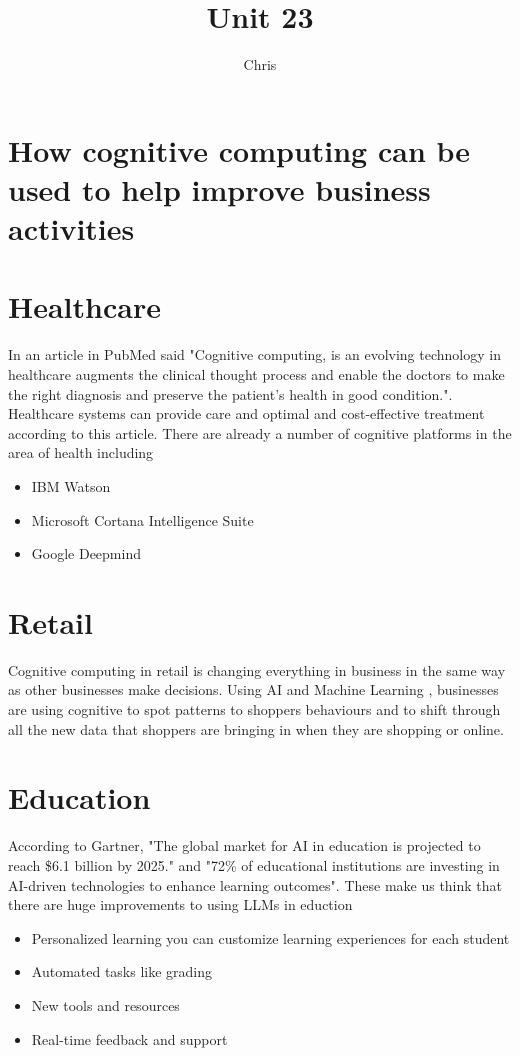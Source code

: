 \documentclass{article}
\title{Unit 23}
\author{Chris}
\date{}
\begin{document}
\section{How cognitive computing can be used to help improve business activities}

\section{Healthcare}
In an article in PubMed said "Cognitive computing, is an evolving technology in healthcare augments the clinical thought process and enable the doctors to make the right diagnosis and preserve the patient's health in good condition."\cite{pubmed}. Healthcare systems can provide care and optimal and cost-effective treatment according to this article.
There are already a number of cognitive platforms in the area of health including
\begin{itemize}
    \item IBM Watson
    \item Microsoft Cortana Intelligence Suite
    \item Google Deepmind
\end{itemize}



\section{Retail}
Cognitive computing in retail is changing everything in business in the same way as other businesses make decisions. Using AI and Machine Learning , businesses are using cognitive to spot patterns to shoppers behaviours and to shift through all the new data that shoppers are bringing in when they are shopping or online.

\section{Education}
According to Gartner, "The global market for AI in education is projected to reach \$6.1 billion by 2025." \cite{emb} and "72\% of educational institutions are investing in AI-driven technologies to enhance learning outcomes".
These make us think that there are huge improvements to using LLMs in eduction 
\begin{itemize}
    \item Personalized learning you can customize learning experiences for each student
    \item Automated tasks like grading
    \item New tools and resources
    \item Real-time feedback and support
\end{itemize} \cite{packtpub}
\end{document}
